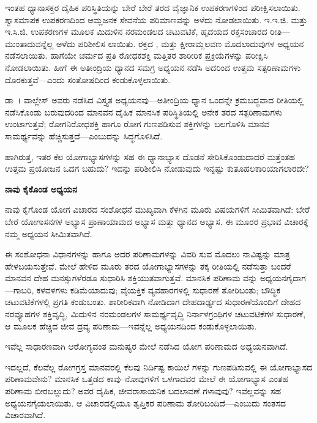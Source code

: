 ಇಂತಹ ಧ್ಯಾನಾಸಕ್ತರ ದೈಹಿಕ ಪರಿಸ್ಥಿತಿಯನ್ನು ಬೇರೆ ಬೇರೆ ತರದ ವೈಜ್ಞಾನಿಕ ಉಪಕರಣಗಳಿಂದ ಪರೀಕ್ಷಿಸಲಾಯಿತು. ಶ್ವಾಸಮಾಪಕ ಉಪಕರಣದಿಂದ ಆಮ್ಲಜನಕ ಸೇವನೆಯ ಪರಿಮಾಣವನ್ನು ಅಳೆದು ನೋಡಲಾಯಿತು. ಇ.ಇ.ಜಿ. ಮತ್ತು ಇ.ಸಿ.ಜಿ. ಉಪಕರಣಗಳ ಮೂಲಕ ಮಿದುಳಿನ ನರಮಂಡಲದ ಚಟುವಟಿಕೆ, ಹೃದಯದ ರಕ್ತಸಂಚಾರದ ರೀತಿ—ಮುಂತಾದುವನ್ನೆಲ್ಲ ಅಳೆದು ಪರಿಶೀಲಿಸ ಲಾಯಿತು. ರಕ್ತದ ,  ಮತ್ತು ಕ್ಷೀರಾಮ್ಲಲವಣ  ಮೊದಲಾದುವುಗಳ ಅಧ್ಯಯನ ನಡೆಸಲಾಯಿತು. ಹಾಗೆಯೇ ಚರ್ಮದ ಪ್ರತಿ ರೋಧಕಶಕ್ತಿ ಮತ್ತಿತರ ಶಾರೀರಿಕ ಪ್ರಕ್ರಿಯೆಗಳನ್ನು ಪರೀಕ್ಷಿಸಿ ನೋಡಲಾಯಿತು. ಹೀಗೆ ಈ ಅತೀಂದ್ರಿಯ ಧ್ಯಾನದ ಸಮಗ್ರ ಅಧ್ಯಯನ ನಡೆಸಿ ಅದರಿಂದ ಉತ್ತಮ ಸತ್ಪರಿಣಾಮಗಳು ದೊರಕುತ್ತವೆ—ಎಂದು ಸಂತೋಷದಿಂದ ಕಂಡುಕೊಳ್ಳಲಾಯಿತು.

ಡಾ~। ವಾಲ್ಲೇಸ್ ಅವರು ನಡೆಸಿದ ವಿಸ್ತ್ಯತ ಅಧ್ಯಯನವು—ಅತೀಂದ್ರಿಯ ಧ್ಯಾನ ಒಂದನ್ನೇ ಕ್ರಮಬದ್ಧವಾದ ರೀತಿಯಲ್ಲಿ ನಡೆಸಿಕೊಂಡು ಬರುವುದರಿಂದ ಮಾನವನ ದೈಹಿಕ ಮಾನಸಿಕ ಪರಿಸ್ಥಿತಿಯಲ್ಲಿ ಅನೇಕ ತರದ ಸತ್ಪರಿಣಾಮಗಳು ಉಂಟಾಗುತ್ತವೆ; ರೋಗನಿರೋಧಶಕ್ತಿ ಹಾಗೂ ರೋಗ ಗುಣಪಡಿಸುವ ಶಕ್ತಿಗಳನ್ನು ಬಲಗೊಳಿಸಿ ಮಾನವ ಸಾಮರ್ಥ್ಯವನ್ನು ಹೆಚ್ಚಿಸುತ್ತದೆ—ಎಂಬುದನ್ನು ಸಿದ್ಧಗೊಳಿಸಿದೆ.

ಹಾಗಿರುತ್ತ, ಇತರ ಕೆಲ ಯೋಗಾಭ್ಯಾಸಗಳನ್ನು ಸಹ ಈ ಧ್ಯಾನಾಭ್ಯಾಸ ದೊಡನೆ ಸೇರಿಸಿಕೊಂಡುದಾದರೆ ಮತ್ತೆಂತಹ ಉತ್ತಮ ಪ್ರಯೋಜನ ಒದಗ ಬಹುದು? ಇದನ್ನು ಪರಿಶೀಲಿಸಿ ನೋಡುವುದು ಇನ್ನಷ್ಟು ಕುತೂಹಲಕಾರಿಯಾಗಲಾರದೇ?

\textbf{ನಾವು ಕೈಕೊಂಡ ಅಧ್ಯಯನ}

ನಾವು ಕೈಗೊಂಡ ಯೋಗ ವಿಚಾರದ ಸಂಶೋಧನೆ ಮುಖ್ಯವಾಗಿ ಕೆಳಗಿನ ಮೂರು ವಿಷಯಗಳಿಗೆ ಸೀಮಿತವಾಗಿದೆ:  ಬೇರೆ ಬೇರೆ ಯೋಗಾಸನಗಳ ಅಭ್ಯಾಸ  ಪ್ರಾಣಾಯಾಮದ ಅಭ್ಯಾಸ ಮತ್ತು  ಧ್ಯಾನದ ಅಭ್ಯಾಸ. ಈ ಮೂರರ ಪ್ರಭಾವ ವಿಚಾರಕ್ಕೆ ನಮ್ಮ ಅಧ್ಯಯನ ಸೀಮಿತವಾಗಿದೆ.

ಈ ಸಂಶೋಧನಾ ವಿಧಾನಗಳನ್ನು ಹಾಗೂ ಅದರ ಪರಿಣಾಮಗಳನ್ನು ವಿವರಿ ಸುವ ಮೊದಲು ನಾವಿಷ್ಟನ್ನು ಮಾತ್ರ ಹೇಳಬಯಸುತ್ತೇವೆ. ಮೇಲೆ ಹೇಳಿದ ಮೂರು ತರದ ಯೋಗಾಭ್ಯಾಸಗಳನ್ನು ತಕ್ಕ ರೀತಿಯಲ್ಲಿ ನಡೆಸುತ್ತಾ ಬಂದರೆ ಮಾನವನ ದೇಹ ಮನಸ್ಸುಗಳೆರಡೂ ಸುಧಾರಿಸಿ ಶಕ್ತಿಯುತವಾಗುತ್ತವೆ. ಮಾನಸಿಕ ಪರಿಣಾಮ ವನ್ನು ಅಧ್ಯಯನಗೈದಾಗ—ಗಾಬರಿ, ಕಳವಳಗಳು ಕಡಿಮೆಯಾದುವು; ವೈಯಕ್ತಿಕ ವ್ಯವಹಾರಗಳಲ್ಲಿ ಸುಧಾರಣೆ ತೋರಿಬಂತು; ಬೌದ್ಧಿಕ ಚಟುವಟಿಕೆಗಳಲ್ಲಿ ಪ್ರಗತಿ ಕಂಡುಬಂತು. ಶಾರೀರಿಕವಾಗಿ ನೋಡಿದಾಗ ದೇಹದಾರ್ಢ್ಯದ ಸುಧಾರಣೆಯೊಂದಿಗೆ ದೇಹದ ನರವ್ಯೂಹಗಳ ಶಕ್ತಿವೃದ್ಧಿ, ಮಿದುಳಿನ ನರಮಂಡಲಗಳ ಸಾಮರ್ಥ್ಯವೃದ್ಧಿ ನಿರ್ನಾಳಗ್ರಂಥಿಗಳ ಚಟುವಟಿಕೆಗಳ ಸುಧಾರಣೆ, ಆ ಮೂಲಕ ಹೆಚ್ಚಿದ ಜೀವ ದ್ರವ್ಯ ಪರಿಣಾಮ—ಇವನ್ನೆಲ್ಲ ಅಧ್ಯಯನದಿಂದ ಕಂಡುಕೊಳ್ಳಲಾಯಿತು.

ಇವೆಲ್ಲ ಸಾಧಾರಣವಾಗಿ ಆರೋಗ್ಯವಂತ ಮನುಷ್ಯರ ಮೇಲೆ ನಡೆಸಿದ ಯೋಗ ಪರಿಣಾಮದ ಅಧ್ಯಯನವಾಗಿದೆ.

ಇದಲ್ಲದೆ, ಕೆಲವೆಲ್ಲ ರೋಗಗ್ರಸ್ತ ಮಾನವರಲ್ಲಿ ಕೆಲವು ನಿರ್ದಿಷ್ಟ ಕಾಯಿಲೆ ಗಳನ್ನು ಗುಣಪಡಿಸುವಲ್ಲಿ ಈ ಯೋಗಾಭ್ಯಾಸದ ಪರಿಣಾಮವೇನು? ಮಾನಸಿಕ ಒತ್ತಡದ ಕಾವು–ನೋವುಗಳಿಗೆ ಒಳಗಾದವರ ಮೇಲೆ ಈ ಯೋಗಾಭ್ಯಾಸ ಎಂತಹ ಪರಿಣಾಮ ಬೀರಬಲ್ಲುದು? ಅವರ ದೈಹಿಕ, ಜೀವರಾಸಾಯನಿಕ ಬದಲಾವಣೆ ಗಳಾವುವು? ಇವೆಲ್ಲವನ್ನು ಸಹ ಅಧ್ಯಯನಗೈಯಲಾಯಿತು. ಆ ವಿಚಾರದಲ್ಲಿಯೂ ತೃಪ್ತಿಕರ ಪರಿಣಾಮ ತೋರಿಬಂದಿದೆ—ಎಂಬುದು ಸಂತಸದ ವಿಚಾರವಾಗಿದೆ.

